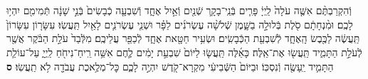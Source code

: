 \documentclass[twoside, openany, parskip=half, 11pt]{book}
\begin{document}
\begin{footnotesize}
\begin{multicols}{2}
\\
\\
וְֿהִקְרַבְתֶּ֨ם אִשֶּׁ֤ה עֹלָה֙ לַֽיְיָ֔ פָּרִ֧ים בְּֿנֵֽי־בָקָ֛ר שְֿׁנַ֖יִם וְֿאַ֣יִל אֶחָ֑ד וְֿשִׁבְעָ֤ה כְֿבָשִׂים֙ בְּֿנֵ֣י שָׁנָ֔ה תְּֿמִימִ֖ם יִהְי֥וּ לָכֶֽם׃ וּמִ֨נְחָתָ֔ם סֹ֖לֶת בְּֿלוּלָ֣ה בַשָּׁ֑מֶן שְֿׁלֹשָׁ֨ה עֶשְׂרֹנִ֜ים לַפָּ֗ר וּשְׁנֵ֧י עֶשְׂרֹנִ֛ים לָאַ֖יִל תַּֽעֲשֽׂוּ׃ עִשָּׂר֤וֹן עִשָּׂרוֹן֙ תַּֽעֲשֶׂ֔ה לַכֶּ֖בֶשׂ הָֽאֶחָ֑ד לְֿשִׁבְעַ֖ת הַכְּֿבָשִֽׂים׃ וּשְׂעִ֥יר חַטָּ֖את אֶחָ֑ד לְֿכַפֵּ֖ר עֲלֵיכֶֽם׃ מִלְּֿבַד֙ עֹלַ֣ת הַבֹּ֔קֶר אֲשֶׁ֖ר לְֿעֹלַ֣ת הַתָּמִ֑יד תַּֽעֲשׂ֖וּ אֶת־אֵֽלֶּה׃ כָּאֵ֜לֶּה תַּֽעֲשׂ֤וּ לַיּוֹם֙ שִׁבְעַ֣ת יָמִ֔ים לֶ֛חֶם אִשֵּׁ֥ה רֵֽיחַ־נִיחֹ֖חַ לַֽיְיָ֑ עַל־עוֹלַ֧ת הַתָּמִ֛יד יֵֽעָשֶׂ֖ה וְֿנִסְכּֽוֹ׃ וּבַיּוֹם֙ הַשְּֿׁבִיעִ֔י מִקְרָא־קֹ֖דֶשׁ יִהְיֶ֣ה לָכֶ֑ם כׇּל־מְלֶ֥אכֶת עֲבֹדָ֖ה לֹ֥א תַֽעֲשֽׂוּ׃ \textbf{ס}


\end{multicols}
\end{footnotesize}
\end{document}
